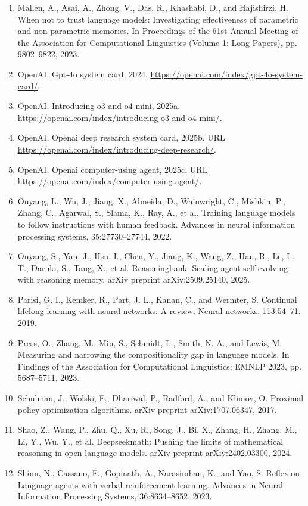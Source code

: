 \documentclass[11pt,UTF8,fontset=fandol]{ctexart}
\begin{document}
\begin{enumerate}[leftmargin=2em,itemsep=0.15em]
\item Mallen, A., Asai, A., Zhong, V., Das, R., Khashabi, D., and Hajishirzi, H. When not to trust language models: Investigating effectiveness of parametric and non-parametric memories. In Proceedings of the 61st Annual Meeting of the Association for Computational Linguistics (Volume 1: Long Papers), pp. 9802--9822, 2023.
\item OpenAI. Gpt-4o system card, 2024. \url{https://openai.com/index/gpt-4o-system-card/}.
\item OpenAI. Introducing o3 and o4-mini, 2025a. \url{https://openai.com/index/introducing-o3-and-o4-mini/}.
\item OpenAI. Openai deep research system card, 2025b. URL \url{https://openai.com/index/introducing-deep-research/}.
\item OpenAI. Openai computer-using agent, 2025c. URL \url{https://openai.com/index/computer-using-agent/}.
\item Ouyang, L., Wu, J., Jiang, X., Almeida, D., Wainwright, C., Mishkin, P., Zhang, C., Agarwal, S., Slama, K., Ray, A., et al. Training language models to follow instructions with human feedback. Advances in neural information processing systems, 35:27730--27744, 2022.
\item Ouyang, S., Yan, J., Hsu, I., Chen, Y., Jiang, K., Wang, Z., Han, R., Le, L. T., Daruki, S., Tang, X., et al. Reasoningbank: Scaling agent self-evolving with reasoning memory. arXiv preprint arXiv:2509.25140, 2025.
\item Parisi, G. I., Kemker, R., Part, J. L., Kanan, C., and Wermter, S. Continual lifelong learning with neural networks: A review. Neural networks, 113:54--71, 2019.
\item Press, O., Zhang, M., Min, S., Schmidt, L., Smith, N. A., and Lewis, M. Measuring and narrowing the compositionality gap in language models. In Findings of the Association for Computational Linguistics: EMNLP 2023, pp. 5687--5711, 2023.
\item Schulman, J., Wolski, F., Dhariwal, P., Radford, A., and Klimov, O. Proximal policy optimization algorithms. arXiv preprint arXiv:1707.06347, 2017.
\item Shao, Z., Wang, P., Zhu, Q., Xu, R., Song, J., Bi, X., Zhang, H., Zhang, M., Li, Y., Wu, Y., et al. Deepseekmath: Pushing the limits of mathematical reasoning in open language models. arXiv preprint arXiv:2402.03300, 2024.
\item Shinn, N., Cassano, F., Gopinath, A., Narasimhan, K., and Yao, S. Reflexion: Language agents with verbal reinforcement learning. Advances in Neural Information Processing Systems, 36:8634--8652, 2023.

\end{enumerate}
\end{document}
